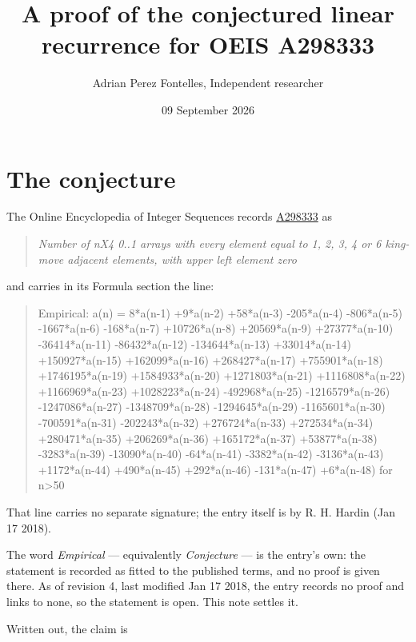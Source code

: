 \documentclass[11pt]{article}
\title{A proof of the conjectured linear recurrence for OEIS A298333}
\author{Adrian Perez Fontelles, Independent researcher}
\date{09 September 2026}
\theoremstyle{definition}
\begin{document}
\maketitle
\section{The conjecture}

The Online Encyclopedia of Integer Sequences records \href{https://oeis.org/A298333}{A298333} as

\begin{quote}\itshape Number of nX4 0..1 arrays with every element equal to 1, 2, 3, 4 or 6 king-move adjacent elements, with upper left element zero\end{quote}

and carries in its Formula section the line:

\begin{quote}\ttfamily Empirical: a(n) = 8*a(n-1) +9*a(n-2) +58*a(n-3) -205*a(n-4) -806*a(n-5) -1667*a(n-6) -168*a(n-7) +10726*a(n-8) +20569*a(n-9) +27377*a(n-10) -36414*a(n-11) -86432*a(n-12) -134644*a(n-13) +33014*a(n-14) +150927*a(n-15) +162099*a(n-16) +268427*a(n-17) +755901*a(n-18) +1746195*a(n-19) +1584933*a(n-20) +1271803*a(n-21) +1116808*a(n-22) +1166969*a(n-23) +1028223*a(n-24) -492968*a(n-25) -1216579*a(n-26) -1247086*a(n-27) -1348709*a(n-28) -1294645*a(n-29) -1165601*a(n-30) -700591*a(n-31) -202243*a(n-32) +276724*a(n-33) +272534*a(n-34) +280471*a(n-35) +206269*a(n-36) +165172*a(n-37) +53877*a(n-38) -3283*a(n-39) -13090*a(n-40) -64*a(n-41) -3382*a(n-42) -3136*a(n-43) +1172*a(n-44) +490*a(n-45) +292*a(n-46) -131*a(n-47) +6*a(n-48) for n>50\end{quote}

That line carries no separate signature; the entry itself is by R. H. Hardin (Jan 17 2018).

The word {\itshape Empirical} --- equivalently {\itshape Conjecture} --- is the entry's own: the statement is recorded as fitted to the published terms, and no proof is given there. As of revision 4, last modified Jan 17 2018, the entry records no proof and links to none, so the statement is open. This note settles it.

Written out, the claim is
\end{document}
